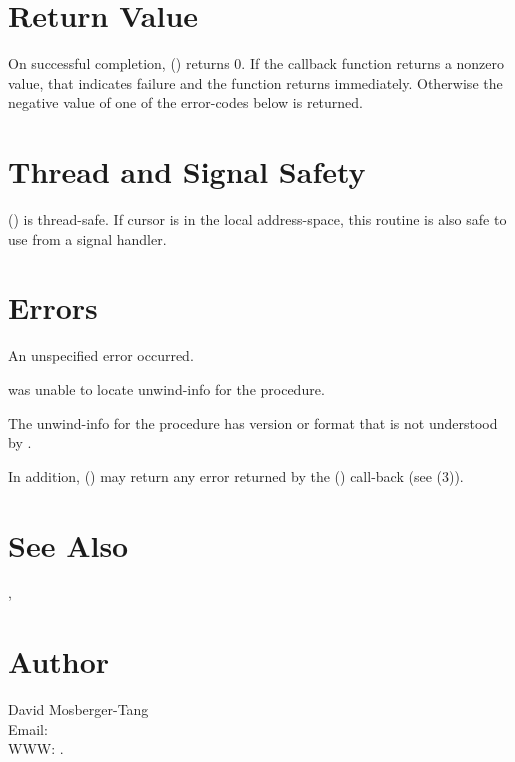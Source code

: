 \documentclass{article}
\begin{document}
\section{Return Value}

On successful completion, () returns
0.  If the callback function returns a nonzero value, that indicates
failure and the function returns immediately.  Otherwise the negative
value of one of the error-codes below is returned.

\section{Thread and Signal Safety}

() is thread-safe.  If cursor  is
in the local address-space, this routine is also safe to use from a
signal handler.

\section{Errors}

\begin{Description}
\item[\Const{UNW\_EUNSPEC}] An unspecified error occurred.
\item[\Const{UNW\_ENOINFO}]  was unable to locate
  unwind-info for the procedure.
\item[\Const{UNW\_EBADVERSION}] The unwind-info for the procedure has
  version or format that is not understood by .
\end{Description}
In addition, () may return any error
returned by the () call-back (see
(3)).

\section{See Also}

,

\section{Author}

\noindent
David Mosberger-Tang\\
Email: \\
WWW: .
\LatexManEnd
\end{document}
